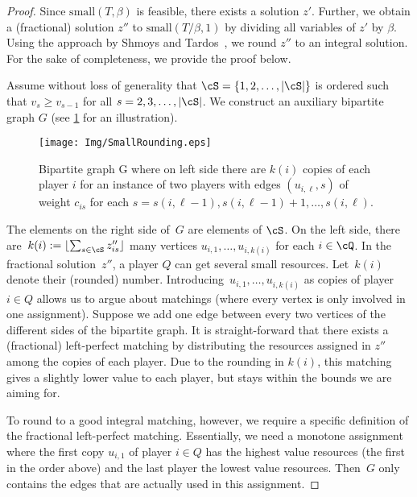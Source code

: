 \begin{proof}
    Since $\mathrm{small}(T, \beta)$ is feasible, there exists a solution $z'$.
    Further, we obtain a (fractional) solution $z''$ to $\mathrm{small}(T/\beta, 1)$ 
    by dividing all variables of $z'$ by $\beta$.
    Using the approach by Shmoys and Tardos~\cite{ShmoysT93},
    we round $z''$ to an integral solution.
    For the sake of completeness, we provide the proof below.

    Assume without loss of generality that $\cS = \{1,2,\dotsc,|\cS|\}$ is ordered such that $v_s \ge v_{s-1}$ for all $s=2,3,\dotsc,|\cS|$.
    We construct an auxiliary bipartite graph $G$ (see \cref{fig:smallRounding} for an illustration).
    \begin{figure}
        \centering
        \texttt{[image: Img/SmallRounding.eps]}
        \caption{Bipartite graph G where on left side there are $k(i)$ copies of each player $i$ for an instance of two players with edges $(u_{i,\ell}, s)$ of weight $c_{is}$ for each $s = s(i,\ell-1),s(i,\ell-1)+1,\dotsc,s(i,\ell)$.} \label{fig:smallRounding}
    \end{figure}
    The elements
    on the right side of~$G$ are elements of
    $\cS$.
    On the left side, there are~$k(i) := \lfloor \sum_{s\in\cS} z''_{is} \rfloor$
    many vertices $u_{i, 1},\dotsc,u_{i,k(i)}$ for each
    $i\in\cQ$.
    In the fractional solution~$z''$, a player $Q$
    can get several small resources.
    Let~$k(i)$ denote their (rounded) number.
    Introducing~$u_{i,1},\dotsc,u_{i,k(i)}$ as
    copies of player $i\in Q$ allows us to argue about matchings
    (where every vertex is only involved in one assignment).
    Suppose we add one edge between every two vertices
    of the different sides of the bipartite graph.
    It is straight-forward that there exists a (fractional)
    left-perfect matching by distributing the resources
    assigned in $z''$ among
    the copies of each player.
    Due to the rounding in $k(i)$, this matching gives a slightly lower value to each player, but stays within the bounds we are aiming for.
    
    To round to a good integral matching, however, we require a specific definition of the
    fractional left-perfect matching.
    Essentially, we need a monotone assignment where
    the first copy $u_{i,1}$ of player $i\in Q$ has the highest value resources (the first in the order above) and the last player the lowest value resources.
    Then~$G$ only contains the edges that 
    are actually used in this assignment.


\end{proof}

